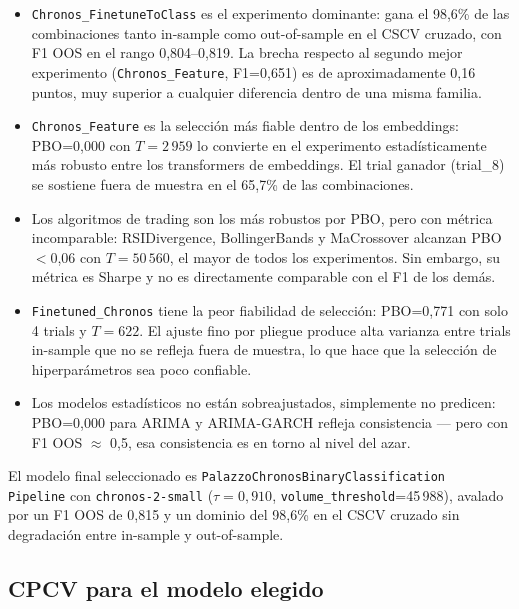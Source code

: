 \begin{itemize}

\item \texttt{Chronos\_FinetuneToClass} es el experimento dominante:  gana el 98,6\% de las combinaciones tanto in-sample como out-of-sample en el CSCV cruzado, con F1 OOS en el rango 0,804--0,819. La brecha respecto al segundo mejor experimento (\texttt{Chronos\_Feature}, F1=0,651) es de aproximadamente 0,16 puntos, muy superior a cualquier diferencia dentro de una misma familia.

\item \texttt{Chronos\_Feature} es la selección más fiable dentro de los embeddings:  PBO=0,000 con $T=2\,959$ lo convierte en el experimento estadísticamente más robusto entre los transformers de embeddings. El trial ganador (trial\_8) se sostiene fuera de muestra en el 65,7\% de las combinaciones.

\item Los algoritmos de trading son los más robustos por PBO, pero con métrica incomparable: RSIDivergence, BollingerBands y MaCrossover alcanzan PBO$<$0,06 con $T=50\,560$, el mayor de todos los experimentos. Sin embargo, su métrica es Sharpe y no es directamente comparable con el F1 de los demás.

\item \texttt{Finetuned\_Chronos} tiene la peor fiabilidad de selección:  PBO=0,771 con solo 4 trials y $T=622$. El ajuste fino por pliegue produce alta varianza entre trials in-sample que no se refleja fuera de muestra, lo que hace que la selección de hiperparámetros sea poco confiable.

\item Los modelos estadísticos no están sobreajustados, simplemente no predicen:  PBO=0,000 para ARIMA y ARIMA-GARCH refleja consistencia — pero con F1 OOS $\approx$ 0,5, esa consistencia es en torno al nivel del azar.


\end{itemize}

El modelo final seleccionado es  \texttt{PalazzoChronosBinaryClassification}\\\texttt{Pipeline} con \texttt{chronos-2-small} ($\tau=0,910$, \texttt{volume\_threshold}=45\,988), avalado por un F1 OOS de 0,815 y un dominio del 98,6\% en el CSCV cruzado sin degradación entre in-sample y out-of-sample.


\subsection{CPCV para el modelo elegido}

